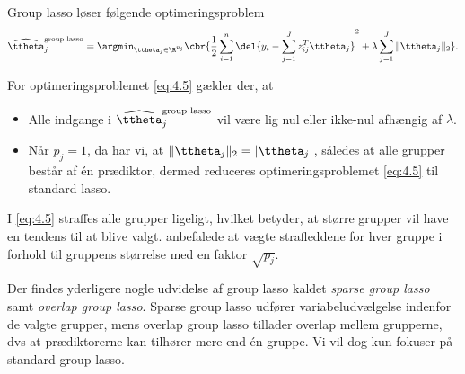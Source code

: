 \begin{defn}[Group lasso]
Group lasso løser følgende optimeringsproblem
\begin{align}
\widehat{\ttheta}_j^{\text{group lasso}} = \argmin_{\ttheta_j \in \R^{p_j}} \cbr{\frac{1}{2} \sum_{i=1}^n \del{y_i - \sum_{j=1}^J z_{ij}^T \ttheta_j}^2 + \lambda \sum_{j=1}^J \Vert \ttheta_j \Vert_2}. \label{eq:4.5}
\end{align}
\end{defn}
For optimeringsproblemet \eqref{eq:4.5} gælder der, at
\begin{itemize}
\item Alle indgange i $\widehat{\ttheta}_j^\text{group lasso}$ vil være lig nul eller ikke-nul afhængig af \(\lambda\).
\item Når $p_j=1$, da har vi, at $\Vert \ttheta_j \Vert_2 = \vert \ttheta_j \vert$, således at alle grupper består af én prædiktor, dermed reduceres optimeringsproblemet \eqref{eq:4.5} til standard lasso.
\end{itemize}
%
I \eqref{eq:4.5} straffes alle grupper ligeligt, hvilket betyder, at større grupper vil have en tendens til at blive valgt.
\citep{group_lasso} anbefalede at vægte strafleddene for hver gruppe i forhold til gruppens størrelse med en faktor \(\sqrt{p_j}\).

Der findes yderligere nogle udvidelse af group lasso kaldet \textit{sparse group lasso} samt \textit{overlap group lasso}.
Sparse group lasso udfører variabeludvælgelse indenfor de valgte grupper, mens overlap group lasso tillader overlap mellem grupperne, dvs at prædiktorerne kan tilhører mere end én gruppe.
Vi vil dog kun fokuser på standard group lasso.

